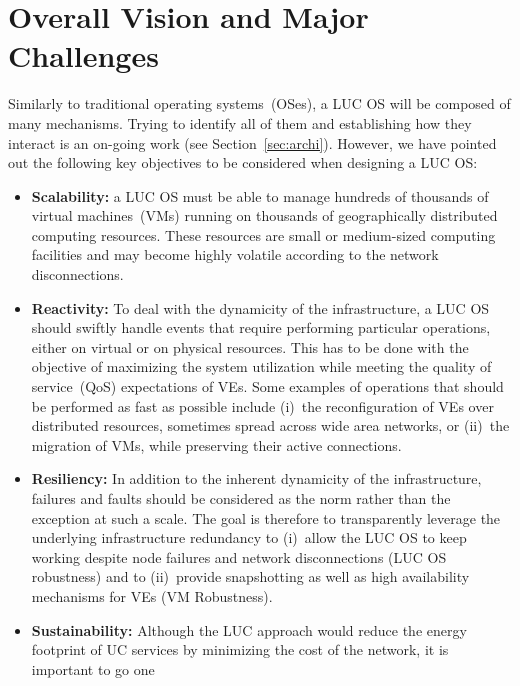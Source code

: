 \section{Overall Vision and Major Challenges\label{sec:challenges}}

Similarly to traditional operating systems~(OSes), a LUC OS will be composed of
many mechanisms. Trying to identify all of them and establishing how they
interact is an on-going work (see Section~\ref{sec:archi}). However,
we have pointed out the following
key objectives to be considered when designing a LUC OS:

\begin{itemize} 
\item \textbf{Scalability:} a LUC OS must be able to manage hundreds of
  thousands of virtual machines~(VMs) running on thousands of 
  geographically distributed computing resources.  These resources are small or
  medium-sized computing facilities and may become highly volatile according to the network disconnections.  
\item \textbf{Reactivity:} To deal with the dynamicity of the infrastructure, a LUC OS
  should swiftly handle events that require performing particular
  operations, either on virtual or on physical resources. This has to be done with the
  objective of maximizing the system utilization while meeting the quality of service~(QoS) expectations of VEs. 
  Some examples of operations that should be performed as fast as possible include (i)~the reconfiguration
  of VEs over distributed resources, sometimes spread across wide area networks, or (ii)~the migration of VMs, 
  while preserving their active connections.
\item \textbf{Resiliency:} In addition to the inherent dynamicity of the
  infrastructure, failures and faults should be considered as the norm rather than the
exception at such a scale. The goal is therefore to transparently leverage the
underlying infrastructure redundancy to (i)~allow the LUC OS to keep
working despite node failures and network disconnections (LUC OS robustness) and to (ii)~provide
snapshotting as well as high availability mechanisms for VEs (VM Robustness).
\item \textbf{Sustainability:} Although the LUC approach would reduce the energy
footprint of UC services by minimizing the cost of the network, 
it is important to go one

\end{itemize}
